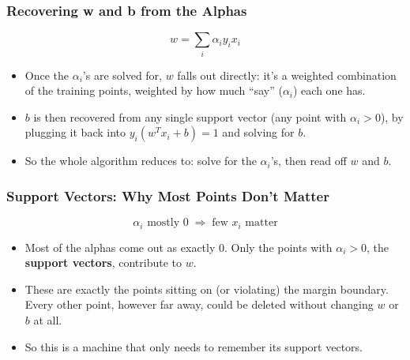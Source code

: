 \begin{frame}[fragile] \frametitle{Recovering w and b from the Alphas}
\[
w = \sum_i \alpha_i y_i x_i
\]
\begin{itemize}
\item Once the $\alpha_i$'s are solved for, $w$ falls out directly: it's a weighted combination of the training points, weighted by how much ``say'' ($\alpha_i$) each one has.
\item $b$ is then recovered from any single support vector (any point with $\alpha_i>0$), by plugging it back into $y_i(w^Tx_i+b)=1$ and solving for $b$.
\item So the whole algorithm reduces to: solve for the $\alpha_i$'s, then read off $w$ and $b$.
\end{itemize}
\end{frame}

\begin{frame}[fragile] \frametitle{Support Vectors: Why Most Points Don't Matter}
\[
\alpha_i \text{ mostly } 0 \;\Rightarrow\; \text{few } x_i \text{ matter}
\]
\begin{itemize}
\item Most of the alphas come out as exactly 0. Only the points with $\alpha_i>0$, the \textbf{support vectors}, contribute to $w$.
\item These are exactly the points sitting on (or violating) the margin boundary. Every other point, however far away, could be deleted without changing $w$ or $b$ at all.
\item So this is a machine that only needs to remember its support vectors.
\end{itemize}
\end{frame}

